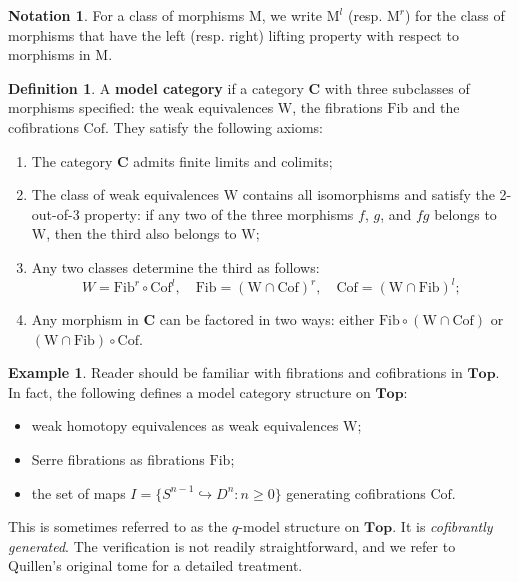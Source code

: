 \documentclass[psamsfonts]{amsart}
\theoremstyle{definition}
\newtheorem{defn}{Definition}[section]
\newtheorem{exmp}{Example}[section]
\newtheorem{notn}{Notation}[section]
\newcommand{\Top}{\mathbf{Top}}
\newcommand{\W}{\mathrm{W}}
\newcommand{\Fib}{\mathrm{Fib}}
\newcommand{\Cof}{\mathrm{Cof}}
\numberwithin{equation}{section}
\begin{document}
\begin{notn}
For a class of morphisms $\mathrm{M}$, we write $\mathrm{M}^l$ (resp. $\mathrm{M}^r$) for the class of morphisms that have the left (resp. right) lifting property with respect to morphisms in $\mathrm{M}$.
\end{notn}

\begin{defn}
A \textbf{model category} if a category $\mathbf{C}$ with three subclasses of morphisms specified: the weak equivalences $\W$, the fibrations $\Fib$ and the cofibrations $\Cof$. They satisfy the following axioms:\begin{enumerate}[(M1)]
    \item The category $\mathbf{C}$ admits finite limits and colimits;
    \item The class of weak equivalences $\W$ contains all isomorphisms and satisfy the 2-out-of-3 property: if any two of the three morphisms $f$, $g$, and $fg$ belongs to $\W$, then the third also belongs to $\W$;
    \item Any two classes determine the third as follows:
    \[W=\Fib^r\circ\Cof^l,\quad\Fib=(\W\cap\Cof)^r,\quad\Cof=(\W\cap\Fib)^l;\]
    \item Any morphism in $\mathbf{C}$ can be factored in two ways: either $\Fib\circ(\W\cap\Cof)$ or $(\W\cap\Fib)\circ\Cof$.
\end{enumerate}
\end{defn}

\begin{exmp}
Reader should be familiar with fibrations and cofibrations in $\Top$. In fact, the following defines a model category structure on $\Top$:\begin{itemize}
    \item weak homotopy equivalences as weak equivalences $\W$;
    \item Serre fibrations as fibrations $\Fib$;
    \item the set of maps $I=\{S^{n-1}\hookrightarrow D^n:n\geq0\}$ generating cofibrations $\Cof$.
\end{itemize}
This is sometimes referred to as the $q$-model structure on $\Top$. It is \textit{cofibrantly generated}. The verification is not readily straightforward, and we refer to Quillen's original tome \cite{Quillen} for a detailed treatment.
\end{exmp}
\end{document}

